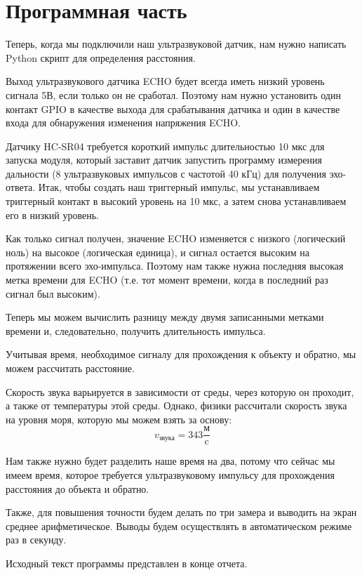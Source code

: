 \documentclass[a4paper, 14pt]{article}
\begin{document}
\newpage
\section{Программная часть}

Теперь, когда мы подключили наш ультразвуковой датчик, нам нужно написать Python скрипт для определения расстояния.

Выход ультразвукового датчика ECHO будет всегда иметь низкий уровень сигнала 5В, если только он не сработал. Поэтому нам нужно установить один контакт GPIO в качестве выхода для срабатывания датчика и один в качестве входа для обнаружения изменения напряжения ECHO.

Датчику HC-SR04 требуется короткий импульс длительностью 10 мкс для запуска модуля, который заставит датчик запустить программу измерения дальности (8 ультразвуковых импульсов с частотой 40 кГц) для получения эхо-ответа. Итак, чтобы создать наш триггерный импульс, мы устанавливаем триггерный контакт в высокий уровень на 10 мкс, а затем снова устанавливаем его в низкий уровень.

Как только сигнал получен, значение ECHO изменяется с низкого (логический ноль) на высокое (логическая единица), и сигнал остается высоким на протяжении всего эхо-импульса. Поэтому нам также нужна последняя высокая метка времени для ECHO (т.е. тот момент времени, когда в последний раз сигнал был высоким).

Теперь мы можем вычислить разницу между двумя записанными метками времени и, следовательно, получить длительность импульса.

Учитывая время, необходимое сигналу для прохождения к объекту и обратно, мы можем рассчитать расстояние.

Скорость звука варьируется в зависимости от среды, через которую он проходит, а также от температуры этой среды. Однако, физики рассчитали скорость звука на уровня моря, которую мы можем взять за основу:
$$v_{\text{звука}} = 343 \frac{\text{м}}{\text{c}}$$

Нам также нужно будет разделить наше время на два, потому что сейчас мы имеем время, которое требуется ультразвуковому импульсу для прохождения расстояния до объекта и обратно.

Также, для повышения точности будем делать по три замера и выводить на экран среднее арифметическое. Выводы будем осуществлять в автоматическом режиме раз в секунду.

Исходный текст программы представлен в конце отчета.

\newpage
\end{document}
